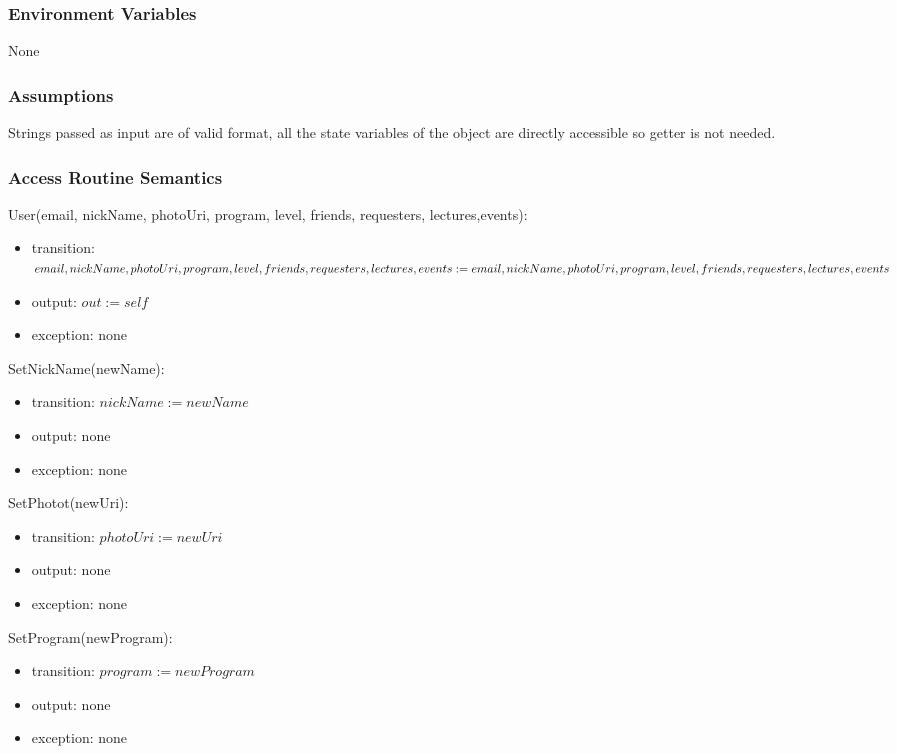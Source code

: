 \documentclass[12pt, titlepage]{article}
\begin{document}
\subsubsection{Environment Variables}

None

\subsubsection{Assumptions}

Strings passed as input are of valid format, all the state variables of the object are directly accessible so getter is not needed.

\subsubsection{Access Routine Semantics}

\noindent User(email, nickName, photoUri, program, level, friends, requesters, lectures,events):
\begin{itemize}
\item transition: $email, nickName, photoUri, program, level, friends, requesters, lectures, events := \\ email, nickName, photoUri, program, level, friends, requesters, lectures, events$
\item output: $out := self$
\item exception: none
\end{itemize}

\noindent SetNickName(newName):
\begin{itemize}
\item transition: $nickName := newName$
\item output: none
\item exception: none
\end{itemize}

\noindent SetPhotot(newUri):
\begin{itemize}
\item transition: $photoUri := newUri$
\item output: none
\item exception: none
\end{itemize}

\noindent SetProgram(newProgram):
\begin{itemize}
\item transition: $program := newProgram$
\item output: none
\item exception: none
\end{itemize}
\end{document}
